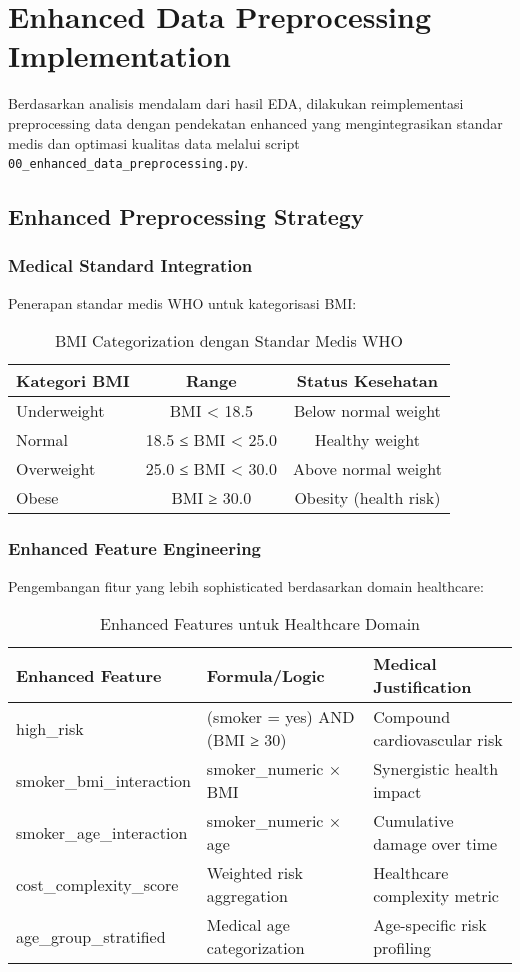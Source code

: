 \section{Enhanced Data Preprocessing Implementation}
\label{sec:enhanced-preprocessing}

Berdasarkan analisis mendalam dari hasil EDA, dilakukan reimplementasi preprocessing data dengan pendekatan enhanced yang mengintegrasikan standar medis dan optimasi kualitas data melalui script \texttt{00\_enhanced\_data\_preprocessing.py}.

\subsection{Enhanced Preprocessing Strategy}
\label{subsec:enhanced-strategy}

\subsubsection{Medical Standard Integration}
Penerapan standar medis WHO untuk kategorisasi BMI:
\begin{table}[H]
\centering
\caption{BMI Categorization dengan Standar Medis WHO}
\label{tab:bmi-medical-standards}
\begin{tabular}{|l|c|c|}
\hline
\textbf{Kategori BMI} & \textbf{Range} & \textbf{Status Kesehatan} \\
\hline
Underweight & BMI < 18.5 & Below normal weight \\
Normal & 18.5 ≤ BMI < 25.0 & Healthy weight \\
Overweight & 25.0 ≤ BMI < 30.0 & Above normal weight \\
Obese & BMI ≥ 30.0 & Obesity (health risk) \\
\hline
\end{tabular}
\end{table}

\subsubsection{Enhanced Feature Engineering}
Pengembangan fitur yang lebih sophisticated berdasarkan domain healthcare:
\begin{table}[H]
\centering
\caption{Enhanced Features untuk Healthcare Domain}
\label{tab:enhanced-healthcare-features}
\begin{tabular}{|l|l|l|}
\hline
\textbf{Enhanced Feature} & \textbf{Formula/Logic} & \textbf{Medical Justification} \\
\hline
high\_risk & (smoker = yes) AND (BMI ≥ 30) & Compound cardiovascular risk \\
smoker\_bmi\_interaction & smoker\_numeric × BMI & Synergistic health impact \\
smoker\_age\_interaction & smoker\_numeric × age & Cumulative damage over time \\
cost\_complexity\_score & Weighted risk aggregation & Healthcare complexity metric \\
age\_group\_stratified & Medical age categorization & Age-specific risk profiling \\
\hline
\end{tabular}
\end{table}

